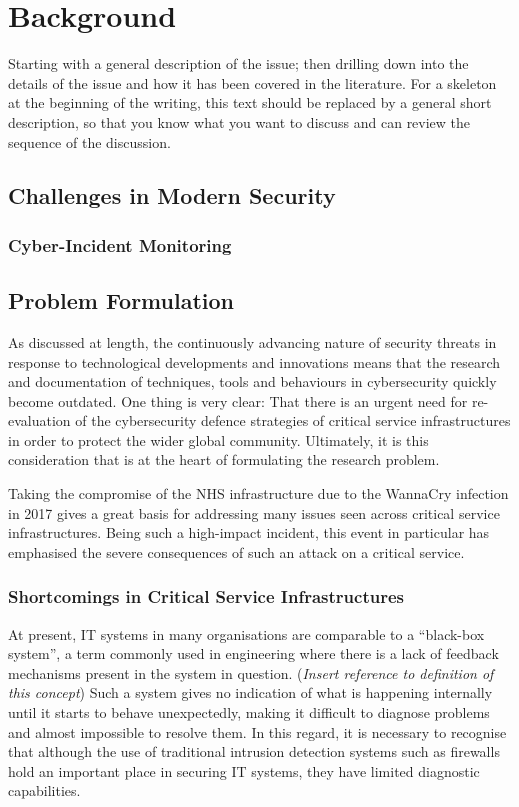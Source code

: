 \chapter{Background}

Starting with a general description of the issue; then drilling down into the details of the issue and how it has been covered in the literature. For a skeleton at the beginning of the writing, this text should be replaced by a general short description, so that you know what you want to discuss and can review the sequence of the discussion.

\section{Challenges in Modern Security}

\subsection{Cyber-Incident Monitoring}




\section{Problem Formulation}

As discussed at length, the continuously advancing nature of security threats in response to technological developments and innovations means that the research and documentation of techniques, tools and behaviours in cybersecurity quickly become outdated. One thing is very clear: That there is an urgent need for re-evaluation of the cybersecurity defence strategies of critical service infrastructures in order to protect the wider global community. Ultimately, it is this consideration that is at the heart of formulating the research problem.

Taking the compromise of the NHS infrastructure due to the WannaCry infection in 2017 gives a great basis for addressing many issues seen across critical service infrastructures. Being such a high-impact incident, this event in particular has emphasised the severe consequences of such an attack on a critical service.

	\subsection{Shortcomings in Critical Service Infrastructures}
	
	At present, IT systems in many organisations are comparable to a “black-box system”, a term commonly used in engineering where there is a lack of feedback mechanisms present in the system in question. (\textit{Insert reference to definition of this concept}) Such a system gives no indication of what is happening internally until it starts to behave unexpectedly, making it difficult to diagnose problems and almost impossible to resolve them. In this regard, it is necessary to recognise that although the use of traditional intrusion detection systems such as firewalls hold an important place in securing IT systems, they have limited diagnostic capabilities.
	
